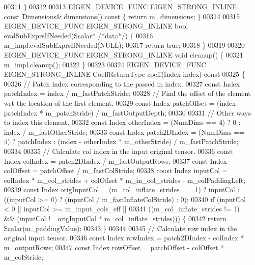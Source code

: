 \begin{DoxyCode}
00311   \}
00312 
00313   EIGEN\_DEVICE\_FUNC EIGEN\_STRONG\_INLINE \textcolor{keyword}{const} Dimensions& dimensions()\textcolor{keyword}{ const }\{ \textcolor{keywordflow}{return} m\_dimensions; \}
00314 
00315   EIGEN\_DEVICE\_FUNC EIGEN\_STRONG\_INLINE \textcolor{keywordtype}{bool} evalSubExprsIfNeeded(Scalar* \textcolor{comment}{/*data*/}) \{
00316     m\_impl.evalSubExprsIfNeeded(NULL);
00317     \textcolor{keywordflow}{return} \textcolor{keyword}{true};
00318   \}
00319 
00320   EIGEN\_DEVICE\_FUNC EIGEN\_STRONG\_INLINE \textcolor{keywordtype}{void} cleanup() \{
00321     m\_impl.cleanup();
00322   \}
00323 
00324   EIGEN\_DEVICE\_FUNC EIGEN\_STRONG\_INLINE CoeffReturnType coeff(Index index)\textcolor{keyword}{ const}
00325 \textcolor{keyword}{  }\{
00326     \textcolor{comment}{// Patch index corresponding to the passed in index.}
00327     \textcolor{keyword}{const} Index patchIndex = index / m\_fastPatchStride;
00328     \textcolor{comment}{// Find the offset of the element wrt the location of the first element.}
00329     \textcolor{keyword}{const} Index patchOffset = (index - patchIndex * m\_patchStride) / m\_fastOutputDepth;
00330 
00331     \textcolor{comment}{// Other ways to index this element.}
00332     \textcolor{keyword}{const} Index otherIndex = (NumDims == 4) ? 0 : index / m\_fastOtherStride;
00333     \textcolor{keyword}{const} Index patch2DIndex = (NumDims == 4) ? patchIndex : (index - otherIndex * m\_otherStride) / 
      m\_fastPatchStride;
00334 
00335     \textcolor{comment}{// Calculate col index in the input original tensor.}
00336     \textcolor{keyword}{const} Index colIndex = patch2DIndex / m\_fastOutputRows;
00337     \textcolor{keyword}{const} Index colOffset = patchOffset / m\_fastColStride;
00338     \textcolor{keyword}{const} Index inputCol = colIndex * m\_col\_strides + colOffset * m\_in\_col\_strides - m\_colPaddingLeft;
00339     \textcolor{keyword}{const} Index origInputCol = (m\_col\_inflate\_strides == 1) ? inputCol : ((inputCol >= 0) ? (inputCol / 
      m\_fastInflateColStride) : 0);
00340     \textcolor{keywordflow}{if} (inputCol < 0 || inputCol >= m\_input\_cols\_eff ||
00341         ((m\_col\_inflate\_strides != 1) && (inputCol != origInputCol * m\_col\_inflate\_strides))) \{
00342       \textcolor{keywordflow}{return} Scalar(m\_paddingValue);
00343     \}
00344 
00345     \textcolor{comment}{// Calculate row index in the original input tensor.}
00346     \textcolor{keyword}{const} Index rowIndex = patch2DIndex - colIndex * m\_outputRows;
00347     \textcolor{keyword}{const} Index rowOffset = patchOffset - colOffset * m\_colStride;

\end{DoxyCode}
